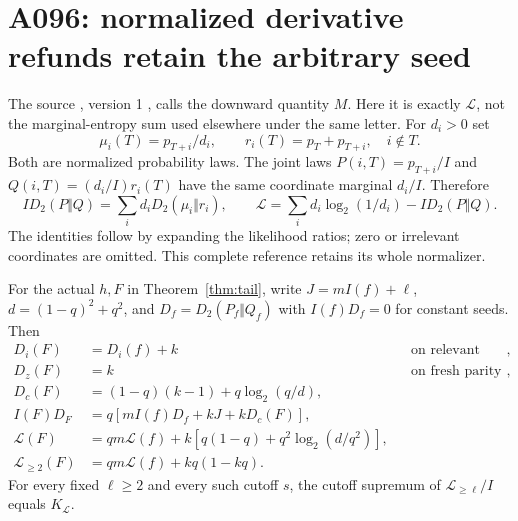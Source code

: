 \section{A096: normalized derivative refunds retain the arbitrary seed}
\label{sec:refund}
The source , version 1
\cite{A096c}, calls the downward quantity $M$.
Here it is exactly $\mathcal L$, not the marginal-entropy sum used
elsewhere under the same letter. For $d_i>0$ set
\[
 \mu_i(T)=p_{T+i}/d_i,\qquad r_i(T)=p_T+p_{T+i},\quad i\notin T.
\]
Both are normalized probability laws. The joint laws
$P(i,T)=p_{T+i}/I$ and $Q(i,T)=(d_i/I)r_i(T)$ have the same
coordinate marginal $d_i/I$. Therefore
\begin{equation}\label{eq:refundbaseline}
 I D_2(P\Vert Q)=\sum_i d_iD_2(\mu_i\Vert r_i),\qquad
 \mathcal L=\sum_i d_i\log_2(1/d_i)-I D_2(P\Vert Q).
\end{equation}
The identities follow by expanding the likelihood ratios; zero or irrelevant
coordinates are omitted. This complete reference retains its whole normalizer.
\begin{proposition}\label{prop:refund}
For the actual $h,F$ in Theorem~\ref{thm:tail}, write
$J=mI(f)+\ell$, $d=(1-q)^2+q^2$, and
$D_f=D_2(P_f\Vert Q_f)$ with $I(f)D_f=0$ for constant seeds. Then
\begin{align}
 D_i(F)&=D_i(f)+k &&\text{on relevant seed coordinates},\\
 D_z(F)&=k &&\text{on fresh parity coordinates},\\
 D_c(F)&=(1-q)(k-1)+q\log_2(q/d),\label{eq:refundcontrol}\\
 I(F)D_F&=q[mI(f)D_f+kJ+kD_c(F)],\label{eq:refundjoint}\\
 \mathcal L(F)&=qm\mathcal L(f)+
       k[q(1-q)+q^2\log_2(d/q^2)],\\
 \mathcal L_{\ge2}(F)&=qm\mathcal L(f)+kq(1-kq).
\end{align}
For every fixed $\ell\ge2$ and every such cutoff $s$, the cutoff
supremum of $\mathcal L_{\ge\ell}/I$ equals $K_{\mathcal L}$.
\end{proposition}

